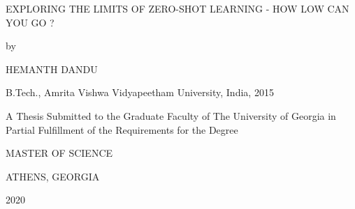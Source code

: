 \thispagestyle{empty}
\begin{center}
    EXPLORING THE LIMITS OF ZERO-SHOT LEARNING - HOW LOW CAN YOU GO ?
    
    \vspace*{2\baselineskip}
    by

    \vspace*{2\baselineskip}
    HEMANTH DANDU
    
    B.Tech., Amrita Vishwa Vidyapeetham University, India, 2015
    \vspace*{4\baselineskip}

    A Thesis Submitted to the Graduate Faculty of The University of Georgia
    in Partial Fulfillment of the Requirements for the Degree
    \vspace*{3\baselineskip}

    MASTER OF SCIENCE
    \vspace*{3\baselineskip}

    ATHENS, GEORGIA
    
    2020
\end{center}

\newpage